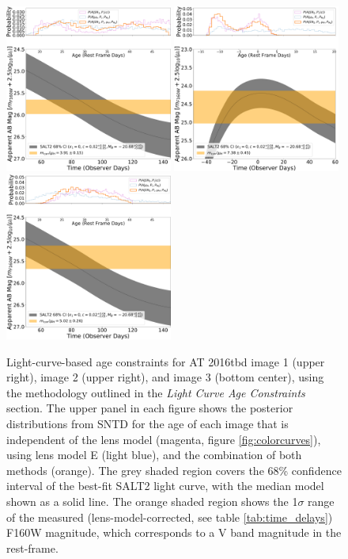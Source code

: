 \documentclass[12pt]{article}
\def\SNABC{AT 2016tbd\xspace}
\begin{document}
{\begin{figure}
    \centering
    \includegraphics[width=0.49\textwidth]{Paper/Figures/lightcurve_image1.pdf}
    \includegraphics[width=0.49\textwidth]{Paper/Figures/lightcurve_image2.pdf}
    \includegraphics[width=0.49\textwidth]{Paper/Figures/lightcurve_image3.pdf}
    \caption{Light-curve-based age constraints for \SNABC image 1 (upper right), image 2 (upper right), and image 3 (bottom center), using the methodology outlined in the \textit{Light Curve Age Constraints} section. The upper panel in each figure shows the posterior distributions from SNTD for the age of each image that is independent of the lens model (magenta, figure \ref{fig:colorcurves}), using lens model E (light blue), and the combination of both methods (orange). The grey shaded region covers the 68\% confidence interval of the best-fit SALT2 light curve, with the median model shown as a solid line. The orange shaded region shows the 1$\sigma$ range of the measured (lens-model-corrected, see table \ref{tab:time_delays}) F160W magnitude, which corresponds to a V band magnitude in the rest-frame.}
    \label{fig:lightcurves}
\end{figure}


}
\end{document}
